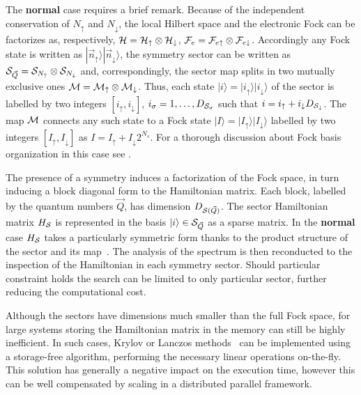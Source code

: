 \documentclass[preprint,3p,10pt]{elsarticle}
\newcommand{\onlinecite}[1]{\nocite{#1}\hspace{-0.1cm}\citenum{#1}}
\newcommand{\ket}[1]
{|#1\rangle}
\def\up{\uparrow} \def\down{\downarrow} \def\dw{\downarrow}
\begin{document}
The {\bf normal} case requires a brief remark. Because of the
independent conservation of $N_\up$ and $N_\dw$, the local Hilbert
space and the electronic Fock can be factorizes as, respectively,
$\HH=\HH_\up\otimes\HH_\dw$, $\FF_e = \FF_{e\up}\otimes \FF_{e\dw}$.  
Accordingly any Fock state is written as $\ket{\vec{n}_\up}\ket{\vec{n}_\dw}$, the symmetry sector can be written as  $\SS_{\vec{Q}} = \SS_{N_\up}\otimes
\SS_{N_\dw}$ and, correspondingly, the sector map splits in two
mutually exclusive ones $\MM = \MM_\up
\otimes \MM_\dw$.
Thus, each state $\ket{i}=\ket{i_\up}\ket{i_\dw}$ of the
sector is labelled by two integers $[i_\up,i_\dw]$, 
$i_\sigma=1,\dots,D_{{\cal S}_\sigma}$ such that $i=i_\up + i_\dw
D_{\SS_\dw}$. The map ${\cal M}$ connects any such state to a Fock state
$\ket{I}=\ket{I_\up}\ket{I_\dw}$ labelled by two integers
$[I_\up,I_\dw]$ as $I=I_\up +   I_\dw 2^{N_s}$. For a thorough
discussion about Fock basis organization in this case see
\onlinecite{amaricci2022}. 

The presence of a symmetry induces a factorization of the Fock space,
in turn inducing a block diagonal form to the Hamiltonian matrix.
Each block, labelled by the quantum numbers $\vec{Q}$, has dimension
$D_{{\cal S}(\vec{Q})}$. The sector Hamiltonian matrix $H_{\cal S}$ is represented in the
basis $\ket{i}\in\SS_{\vec{Q}}$ as a sparse matrix. In the {\bf
  normal} case $H_{\cal S}$ takes a particularly symmetric form thanks to
the product structure of the sector and its map~\cite{amaricci2022}.
The analysis of the spectrum is then reconducted to the inspection of
the Hamiltonian in each symmetry sector. Should particular constraint
holds the search can be limited to only particular sector, further
reducing the computational cost. 

Although the sectors have dimensions much smaller than the full Fock
space, for large systems storing the Hamiltonian matrix in the memory
can still be highly inefficient.
In such cases, Krylov or Lanczos methods~\cite{Lanczos1950JRNBSB,Lin1993CIP,Lehoucq1998,Maschhoff1996} can
be implemented using a storage-free algorithm, performing the
necessary linear operations on-the-fly.
This solution has generally a negative impact on the execution
time, however this can be well compensated by scaling in a distributed 
parallel framework.
\end{document}
